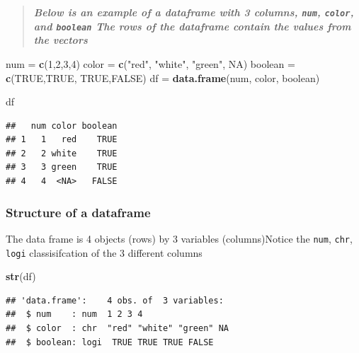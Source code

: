 \documentclass[
]{article}
\newenvironment{Shaded}{\begin{snugshade}}{\end{snugshade}}
\newcommand{\DecValTok}[1]{\textcolor[rgb]{0.00,0.00,0.81}{#1}}
\newcommand{\KeywordTok}[1]{\textcolor[rgb]{0.13,0.29,0.53}{\textbf{#1}}}
\newcommand{\NormalTok}[1]{#1}
\newcommand{\OtherTok}[1]{\textcolor[rgb]{0.56,0.35,0.01}{#1}}
\newcommand{\StringTok}[1]{\textcolor[rgb]{0.31,0.60,0.02}{#1}}
\begin{document}
\begin{quote}
\textbf{\emph{Below is an example of a dataframe with 3 columns,
\texttt{num}, \texttt{color}, and \texttt{boolean} The rows of the
dataframe contain the values from the vectors}}
\end{quote}

\begin{Shaded}
\begin{Highlighting}[]
\NormalTok{num =}\StringTok{ }\KeywordTok{c}\NormalTok{(}\DecValTok{1}\NormalTok{,}\DecValTok{2}\NormalTok{,}\DecValTok{3}\NormalTok{,}\DecValTok{4}\NormalTok{)}
\NormalTok{color =}\StringTok{  }\KeywordTok{c}\NormalTok{(}\StringTok{"red"}\NormalTok{, }\StringTok{"white"}\NormalTok{,  }
           \StringTok{"green"}\NormalTok{, }\OtherTok{NA}\NormalTok{)  }
\NormalTok{boolean =}\StringTok{ }\KeywordTok{c}\NormalTok{(}\OtherTok{TRUE}\NormalTok{,}\OtherTok{TRUE}\NormalTok{,  }
             \OtherTok{TRUE}\NormalTok{,}\OtherTok{FALSE}\NormalTok{) }
\NormalTok{df =}\StringTok{ }\KeywordTok{data.frame}\NormalTok{(num, color, boolean)}

\NormalTok{df}
\end{Highlighting}
\end{Shaded}

\begin{verbatim}
##   num color boolean
## 1   1   red    TRUE
## 2   2 white    TRUE
## 3   3 green    TRUE
## 4   4  <NA>   FALSE
\end{verbatim}

\hypertarget{structure-of-a-dataframe}{%
\subsubsection{\texorpdfstring{\textbf{Structure of a
dataframe}}{Structure of a dataframe}}\label{structure-of-a-dataframe}}

The data frame is 4 objects (rows) by 3 variables (columns)Notice the
\texttt{num}, \texttt{chr}, \texttt{logi} classisifcation of the 3
different columns

\begin{Shaded}
\begin{Highlighting}[]
\KeywordTok{str}\NormalTok{(df) }
\end{Highlighting}
\end{Shaded}

\begin{verbatim}
## 'data.frame':    4 obs. of  3 variables:
##  $ num    : num  1 2 3 4
##  $ color  : chr  "red" "white" "green" NA
##  $ boolean: logi  TRUE TRUE TRUE FALSE
\end{verbatim}
\end{document}
